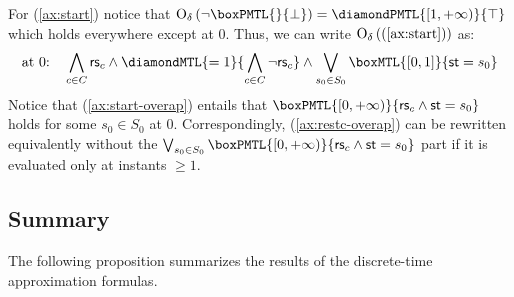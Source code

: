 \documentclass[a4paper]{article}
\newcommand{\frf}[1]{(\ref{#1})}
\newcommand{\overap}[1]{\mathrm{O}_{\delta}\left({#1}\right)}
\newcommand{\logictrue}{\top}
\newcommand{\logicfalse}{\bot}
\newcommand{\st}{\mathsf{st}}
\newcommand{\rest}[1]{\mathsf{rs}_{#1}}
\theoremstyle{plain}
\theoremstyle{definition}
\begin{document}
For \frf{ax:start} notice that $\overap{\neg \boxPMTL{}{\logicfalse}} = \diamondPMTL{[1,+\infty)}{\logictrue}$ which holds everywhere except at $0$.
Thus, we can write $\overap{\frf{ax:start}}$ as:
\begin{equation} \label{ax:start-overap}
  \text{at $0$:}\quad \bigwedge_{c \in C}\rest{c} \wedge \diamondMTL{=1}{\bigwedge_{c \in C}\neg \rest{c}}
                \wedge \bigvee_{s_0 \in S_0} \boxMTL{[0,1]}{ \st = s_0 }
\end{equation}
Notice that \frf{ax:start-overap} entails that $\boxPMTL{[0, +\infty)}{\rest{c} \wedge \st = s_0}$ holds for some $s_0 \in S_0$ at $0$.
Correspondingly, \frf{ax:restc-overap} can be rewritten equivalently without the $\bigvee_{s_0 \in S_0} \boxPMTL{[0, +\infty)}{\rest{c} \wedge \st = s_0}$ part if it is evaluated only at instants $\geq 1$.






\subsection{Summary}
The following proposition summarizes the results of the discrete-time approximation formulas.
\end{document}
